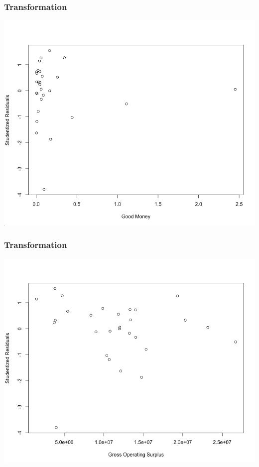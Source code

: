 \documentclass[12pt]{beamer}
\begin{document}
\begin{frame}
\frametitle{Transformation}
\begin{center}
\includegraphics[scale=0.3]{pic14.png}
\end{center}
\end{frame}
\begin{frame}
\frametitle{Transformation}
\begin{center}
\includegraphics[scale=0.3]{pic15.png}
\end{center}
\end{frame}
\end{document}
